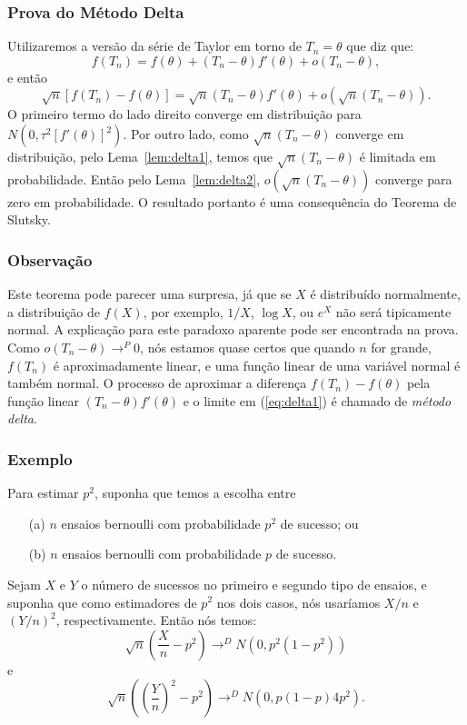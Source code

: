\begin{frame}
\frametitle{\textbf{Prova do Método Delta}}
\baselineskip=13pt
\begin{block}{}


Utilizaremos a versão da série de Taylor em torno de
$T_n=\theta$ que diz que:
$$f(T_n)=f(\theta)+(T_n-\theta)f'(\theta)+o(T_n-\theta),$$
e então
$$\sqrt{n}[f(T_n)-f(\theta)]=\sqrt{n}(T_n-\theta)f'(\theta)+o(\sqrt{n}(T_n-\theta)).$$
O primeiro termo do lado direito converge em distribuição para
$N(0,\tau^2[f'(\theta)]^2)$. Por outro lado, como $\sqrt{n}(T_n-\theta)$ converge em distribuição, pelo
Lema~\ref{lem:delta1}, temos que $\sqrt{n}(T_n-\theta)$ é limitada
em probabilidade. Então pelo Lema~\ref{lem:delta2},
$o(\sqrt{n}(T_n-\theta))$ converge para zero em probabilidade. O
resultado portanto é uma consequência do Teorema de Slutsky.
\end{block}
\end{frame}

\begin{frame}
\frametitle{\textbf{Observação}}
\baselineskip=13pt
\begin{block}{}


Este teorema pode parecer uma surpresa, já que se $X$ é distribuído
normalmente, a distribuição de $f(X)$, por exemplo, $1/X$, $\log X$,
ou $e^X$ não será tipicamente normal. A explicação para este
paradoxo aparente pode ser encontrada na prova. Como
$o(T_n-\theta)\rightarrow^P 0$, nós estamos quase certos que quando $n$
for grande, $f(T_n)$ é aproximadamente linear, e uma função linear de
uma variável normal é também normal. O processo de aproximar a
diferença $f(T_n)-f(\theta)$ pela função linear
$(T_n-\theta)f'(\theta)$ e o limite em (\ref{eq:delta1}) é chamado
de {\em método delta}.

\end{block}
\end{frame}

\begin{frame}
\frametitle{\textbf{Exemplo}}
\baselineskip=13pt
\begin{block}{}


Para estimar $p^2$, suponha que temos a escolha entre
\begin{enumerate}
\item[(a)] $n$ ensaios bernoulli com probabilidade $p^2$ de sucesso;
ou
\item[(b)] $n$ ensaios bernoulli com probabilidade $p$ de sucesso.
\end{enumerate}
Sejam $X$ e $Y$ o número de sucessos no primeiro e segundo tipo de ensaios, e suponha que como estimadores de $p^2$ nos dois casos, nós usaríamos $X/n$
e $(Y/n)^2$, respectivamente. Então nós temos:
$$\sqrt{n}(\frac{X}{n}-p^2)\rightarrow^D N(0,p^2(1-p^2))$$
e
$$\sqrt{n}((\frac{Y}{n})^2-p^2)\rightarrow^D N(0,p(1-p)4p^2).$$

\end{block}
\end{frame}

